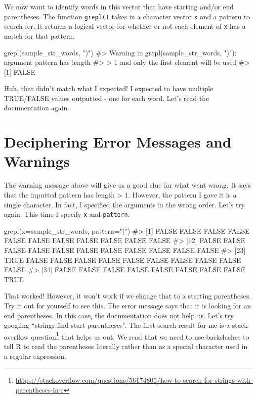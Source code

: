 \documentclass[
  letterpaper,
]{krantz}
\makeatletter
\newenvironment{Shaded}{\begin{snugshade}}{\end{snugshade}}
\newcommand{\AttributeTok}[1]{\textcolor[rgb]{0.40,0.45,0.13}{#1}}
\newcommand{\CommentTok}[1]{\textcolor[rgb]{0.37,0.37,0.37}{#1}}
\newcommand{\FunctionTok}[1]{\textcolor[rgb]{0.28,0.35,0.67}{#1}}
\newcommand{\NormalTok}[1]{\textcolor[rgb]{0.00,0.23,0.31}{#1}}
\newcommand{\StringTok}[1]{\textcolor[rgb]{0.13,0.47,0.30}{#1}}
\renewcommand{\href}[2]{#2\footnote{\url{#1}}}
\newenvironment{kframe}{%
\medskip{}
\setlength{\fboxsep}{.8em}
 \def\at@end@of@kframe{}%
 \ifinner\ifhmode%
  \def\at@end@of@kframe{\end{minipage}}%
  \begin{minipage}{\columnwidth}%
 \fi\fi%
 \def\FrameCommand##1{\hskip\@totalleftmargin \hskip-\fboxsep
 \colorbox{shadecolor}{##1}\hskip-\fboxsep
     \hskip-\linewidth \hskip-\@totalleftmargin \hskip\columnwidth}%
 \MakeFramed {\advance\hsize-\width
   \@totalleftmargin\z@ \linewidth\hsize
   \@setminipage}}%
 {\par\unskip\endMakeFramed%
 \at@end@of@kframe}
\renewenvironment{Shaded}{\begin{kframe}}{\end{kframe}}
\makeatother
\begin{document}
We now want to identify words in this vector that have starting and/or
end parentheses. The function \texttt{grepl()} takes in a character
vector \texttt{x} and a pattern to search for. It returns a logical
vector for whether or not each element of \texttt{x} has a match for
that pattern.

\begin{Shaded}
\begin{Highlighting}[]
\FunctionTok{grepl}\NormalTok{(sample\_str\_words, }\StringTok{")"}\NormalTok{)}
\CommentTok{\#\textgreater{} Warning in grepl(sample\_str\_words, ")"): argument \textquotesingle{}pattern\textquotesingle{} has length}
\CommentTok{\#\textgreater{} \textgreater{} 1 and only the first element will be used}
\CommentTok{\#\textgreater{} [1] FALSE}
\end{Highlighting}
\end{Shaded}

Huh, that didn't match what I expected! I expected to have multiple
TRUE/FALSE values outputted - one for each word. Let's read the
documentation again.

\section{Deciphering Error Messages and
Warnings}\label{deciphering-error-messages-and-warnings}

The warning message above will give us a good clue for what went wrong.
It says that the inputted pattern has length \textgreater{} 1. However,
the pattern I gave it is a single character. In fact, I specified the
arguments in the wrong order. Let's try again. This time I specify
\texttt{x} and \texttt{pattern}.

\begin{Shaded}
\begin{Highlighting}[]
\FunctionTok{grepl}\NormalTok{(}\AttributeTok{x=}\NormalTok{sample\_str\_words, }\AttributeTok{pattern=}\StringTok{")"}\NormalTok{)}
\CommentTok{\#\textgreater{}  [1] FALSE FALSE FALSE FALSE FALSE FALSE FALSE FALSE FALSE FALSE FALSE}
\CommentTok{\#\textgreater{} [12] FALSE FALSE FALSE FALSE FALSE FALSE FALSE FALSE FALSE FALSE FALSE}
\CommentTok{\#\textgreater{} [23]  TRUE FALSE FALSE FALSE FALSE FALSE FALSE FALSE FALSE FALSE FALSE}
\CommentTok{\#\textgreater{} [34] FALSE FALSE FALSE FALSE FALSE FALSE FALSE FALSE  TRUE}
\end{Highlighting}
\end{Shaded}

That worked! However, it won't work if we change that to a starting
parentheses. Try it out for yourself to see this. The error message says
that it is looking for an end parentheses. In this case, the
documentation does not help us. Let's try googling ``stringr find start
parentheses''. The first search result for me is a
\href{https://stackoverflow.com/questions/56174805/how-to-search-for-strings-with-parentheses-in-r}{stack
overflow question} that helps us out. We read that we need to use
backslashes to tell R to read the parentheses literally rather than as a
special character used in a regular expression.
\end{document}
